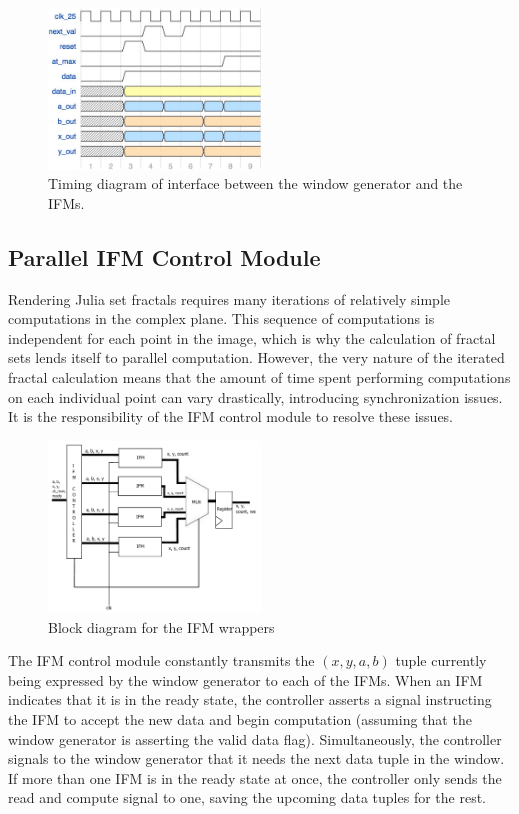 \documentclass{article}
\begin{document}
\begin{figure}[H]
  \centering
    \includegraphics[width=160pt]{timing_diagrams/gen_ifm.pdf}
  \caption{Timing diagram of interface between the window generator
    and the IFMs.}
\end{figure}

\subsection{Parallel IFM Control Module}

Rendering Julia set fractals requires many iterations of relatively
simple computations in the complex plane. This sequence of
computations is independent for each point in the image, which is why
the calculation of fractal sets lends itself to parallel
computation. However, the very nature of the iterated fractal
calculation means that the amount of time spent performing
computations on each individual point can vary drastically,
introducing synchronization issues. It is the responsibility of the
IFM control module to resolve these issues.

\begin{figure}[htb]
  \centering
    \includegraphics[width=160pt]{block_diagrams/ifmunit.pdf}
  \caption{Block diagram for the IFM wrappers}
\end{figure}


The IFM control module constantly transmits the $(x, y, a, b)$ tuple
currently being expressed by the window generator to each of the
IFMs. When an IFM indicates that it is in the ready state, the
controller asserts a signal instructing the IFM to accept the new data
and begin computation (assuming that the window generator is asserting
the valid data flag).  Simultaneously, the controller signals to the
window generator that it needs the next data tuple in the window. If
more than one IFM is in the ready state at once, the controller only
sends the read and compute signal to one, saving the upcoming data
tuples for the rest.
\end{document}
